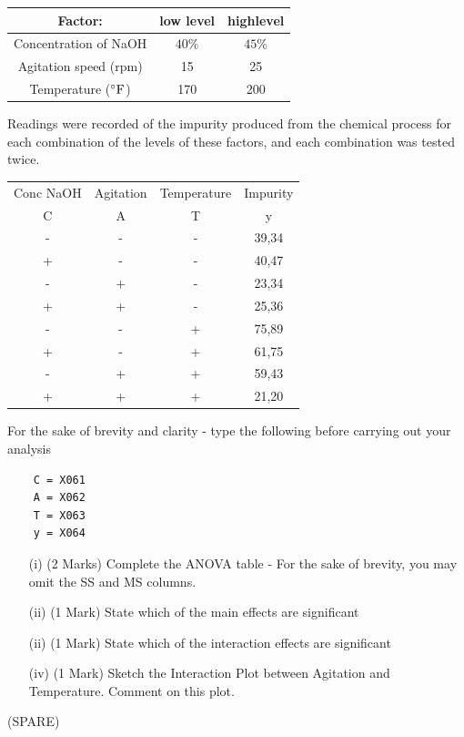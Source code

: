 \documentclass[a4paper,12pt]{article}
\begin{document}
\begin{center}
	\begin{tabular}{|c|c|c|}
		\hline
		Factor: &low level & highlevel  \\ \hline
		Concentration of NaOH & $40\%$ & $45\%$\\
		Agitation speed (rpm) & 15 & 25 \\
		Temperature ($^{\circ}{\rm F}$) & 170 & 200 \\
		\hline
	\end{tabular}
\end{center}
Readings were recorded of the impurity produced from the chemical process for each combination of the levels of these factors, and each combination was tested twice.
\begin{center}
\begin{tabular}{|c|c|c|c|}
	\hline
	Conc NaOH & Agitation & Temperature & Impurity \\
	C & A &T &y \\ \hline 
	-	&	-	&	-	&	 39,34	\\
	+	&	-	&	-	&    40,47	\\
	-	&	+	&	-	&	 23,34	\\
	+	&	+	&	-	&	 25,36	\\
	-	&	-	&	+	&	 75,89  \\
	+	&	-	&	+	&	 61,75	\\
	-	&	+	&	+	&	 59,43	\\
	+	&	+	&	+	&	 21,20\\
	\hline
\end{tabular}
\end{center}
\begin{framed}
\noindent For the sake of brevity and clarity - type the following before carrying out your analysis
	\begin{verbatim}
	C = X061
	A = X062
	T = X063
	y = X064
	\end{verbatim}
\end{framed}
	\begin{itemize}
		\item[(i)] (2 Marks) Complete the ANOVA table - For the sake of brevity, you may omit the SS and MS columns.
		\item[(ii)] (1 Mark) State which of the main effects are significant
		\item[(ii)] (1 Mark) State which of the interaction effects are significant
		\item[(iv)] (1 Mark) Sketch the Interaction Plot between Agitation and Temperature. Comment on this plot.
	\end{itemize}
\newpage(SPARE)
\end{document}

